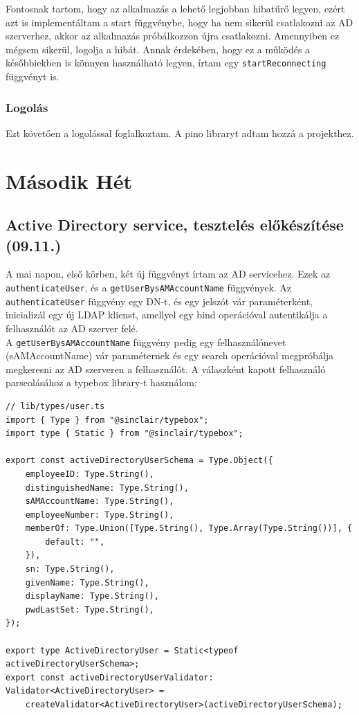 \documentclass[a4paper]{article}
\newcommand{\inlts}[1]{\texttt{#1}}
\begin{document}
Fontosnak tartom, hogy az alkalmazás a lehető legjobban hibatűrő legyen, ezért azt is implementáltam
a start függvénybe, hogy ha nem sikerül csatlakozni az AD szerverhez, akkor az alkalmazás
próbálkozzon újra csatlakozni. Amennyiben ez mégsem sikerül, logolja a hibát. Annak érdekében, hogy
ez a működés a későbbiekben is könnyen használható legyen, írtam egy \inlts{startReconnecting}
függvényt is.

\subsubsection*{Logolás}

Ezt követően a logolással foglalkoztam. A pino libraryt adtam hozzá a projekthez.

\section{Második Hét}

\subsection{Active Directory service, tesztelés előkészítése (09.11.)}

A mai napon, első körben, két új függvényt írtam az AD servicehez. Ezek az \inlts{authenticateUser}, és
a \inlts{getUserBysAMAccountName} függvények. Az \inlts{authenticateUser} függvény egy DN-t, és egy
jelszót vár paraméterként, inicializál egy új LDAP klienst, amellyel egy bind operációval autentikálja a
felhasználót az AD szerver felé. \\

A \inlts{getUserBysAMAccountName} függvény pedig egy felhasználónevet (sAMAccountName) vár
paraméternek és egy search operációval megpróbálja megkeresni az AD szerveren a felhasználót. A
válaszként kapott felhasználó parseolásához a typebox library-t használom:

\FloatBarrier
\begin{verbatim}
// lib/types/user.ts
import { Type } from "@sinclair/typebox";
import type { Static } from "@sinclair/typebox";

export const activeDirectoryUserSchema = Type.Object({
    employeeID: Type.String(),
    distinguishedName: Type.String(),
    sAMAccountName: Type.String(),
    employeeNumber: Type.String(),
    memberOf: Type.Union([Type.String(), Type.Array(Type.String())], {
        default: "",
    }),
    sn: Type.String(),
    givenName: Type.String(),
    displayName: Type.String(),
    pwdLastSet: Type.String(),
});

export type ActiveDirectoryUser = Static<typeof activeDirectoryUserSchema>;
export const activeDirectoryUserValidator: Validator<ActiveDirectoryUser> =
    createValidator<ActiveDirectoryUser>(activeDirectoryUserSchema);
\end{verbatim}
\end{document}
